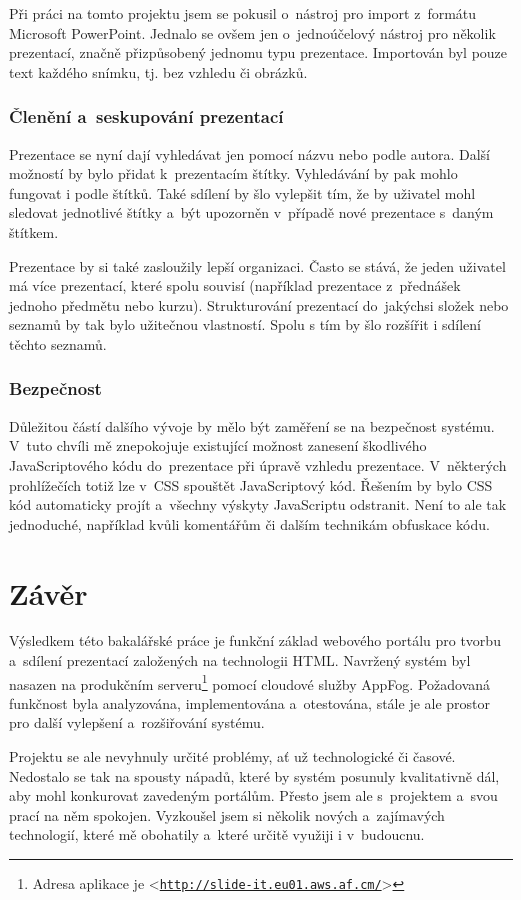 \documentclass[11pt,twoside,a4paper]{book}
\let\oldUrl\url									%
\renewcommand\url[1]{<\texttt{\oldUrl{#1}}>}
\begin{document}
Při práci na tomto projektu jsem se pokusil o~nástroj pro import z~formátu Microsoft PowerPoint. Jednalo se ovšem jen o~jednoúčelový nástroj pro několik prezentací, značně přizpůsobený jednomu typu prezentace. Importován byl pouze text každého snímku, tj. bez vzhledu či obrázků.

\subsection{Členění a~seskupování prezentací}
Prezentace se nyní dají vyhledávat jen pomocí názvu nebo podle autora. Další možností by bylo přidat k~prezentacím štítky. Vyhledávání by pak mohlo fungovat i podle štítků. Také sdílení by šlo vylepšit tím, že by uživatel mohl sledovat jednotlivé štítky a~být upozorněn v~případě nové prezentace s~daným štítkem.

Prezentace by si také zasloužily lepší organizaci. Často se stává, že jeden uživatel má více prezentací, které spolu souvisí (například prezentace z~přednášek jednoho předmětu nebo kurzu). Strukturování prezentací do~jakýchsi složek nebo seznamů by tak bylo užitečnou vlastností. Spolu s tím by šlo rozšířit i sdílení těchto seznamů.

\subsection{Bezpečnost}
Důležitou částí dalšího vývoje by mělo být zaměření se na bezpečnost systému. V~tuto chvíli mě znepokojuje existující možnost zanesení škodlivého Java\-Scriptového kódu do~prezentace při úpravě vzhledu prezentace. V~některých prohlížečích totiž lze v~CSS spouštět Java\-Scriptový kód. Řešením by bylo CSS kód automaticky projít a~všechny výskyty Java\-Scriptu odstranit. Není to ale tak jednoduché, například kvůli komentářům či dalším technikám obfuskace kódu.


\chapter{Závěr}
Výsledkem této bakalářské práce je funkční základ webového portálu pro tvorbu a~sdílení prezentací založených na technologii HTML. Navržený systém byl nasazen na produkčním serveru\footnote{Adresa aplikace je \url{http://slide-it.eu01.aws.af.cm/}} pomocí cloudové služby AppFog. Požadovaná funkčnost byla analyzována, imple\-mentována a~otestována, stále je ale prostor pro další vylepšení a~rozšiřování systému.

Projektu se ale nevyhnuly určité problémy, ať už technologické či časové. Nedostalo se tak na spousty nápadů, které by systém posunuly kvalitativně dál, aby mohl konkurovat zavedeným portálům. Přesto jsem ale s~projektem a~svou prací na něm spokojen. Vyzkoušel jsem si několik nových a~zajímavých technologií, které mě obohatily a~které určitě využiji i v~budoucnu.
\end{document}
